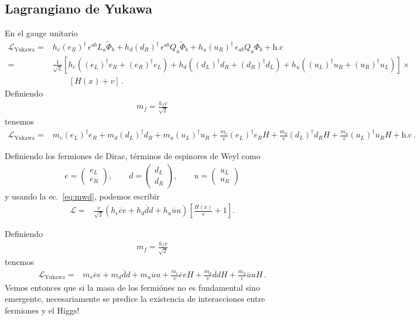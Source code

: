 \subsection{Lagrangiano  de Yukawa }

\begin{frame}
En el gauge unitario
\begin{align}
  \mathcal{L}_{\text{Yukawa}}=& h_e \left( e_R \right)^{\dagger}\,\epsilon^{ab}L_a\widetilde{\Phi}_b +
      h_d \left( d_R \right)^{\dagger}\,\epsilon^{ab}Q_a\widetilde{\Phi}_b +
      h_u \left( u_R \right)^{\dagger}\,\epsilon_{ab}Q_a{\Phi}_{b}+\text{h.c}\nonumber\\
=&\frac{1}{\sqrt{2}}\left[h_e((e_L)^{\dagger}e_R+(e_R)^{\dagger}e_L)+
h_d((d_L)^{\dagger}d_R+(d_R)^{\dagger}d_L)
+h_u((u_L)^{\dagger}u_R+(u_R)^{\dagger}u_L)\right]\times\nonumber\\
&\qquad\left[H(x)+v\right]\,.
\end{align}
Definiendo
\begin{align}
  m_f=\frac{h_fv}{\sqrt{2}}
\end{align}
tenemos
\begin{align}
\label{eq:lyuklr}
  \mathcal{L}_{\text{Yukawa}}=&m_e (e_L)^{\dagger}e_R+m_d (d_L)^{\dagger}d_R+m_u(u_L)^{\dagger}u_R
+\frac{m_e}{v}  (e_L)^{\dagger}e_RH+\frac{m_d}{v}  (d_L)^{\dagger}d_RH+\frac{m_u}{v} (u_L)^{\dagger}u_RH
+\text{h.c}\,.
\end{align}

Definiendo los fermiones de Dirac, términos de espinores de Weyl como
\begin{align}
  e=
  \begin{pmatrix}
    e_L\\
    e_R
  \end{pmatrix},\qquad d=
  \begin{pmatrix}
    d_L\\
    d_R
  \end{pmatrix},\qquad u=
  \begin{pmatrix}
    u_L\\
    u_R
  \end{pmatrix}
\end{align}
y usando la ec.~\eqref{eq:mwd}, podemos escribir
\begin{align*}
\mathcal{L}=&\frac{v}{\sqrt{2}}\left(h_e\overline{e}e+h_d\overline{d}d
+h_u\overline{u}u\right)
\left[\frac{H(x)}{v}+1\right].
\end{align*}

Definiendo
\begin{align}
  m_f=\frac{h_fv}{\sqrt{2}}
\end{align}
tenemos
\begin{align}
\label{eq:lyukfin}
 \mathcal{L}_{\text{Yukawa}}=&m_e\overline{e}e+m_d\overline{d}d
+m_u\overline{u}u+
  \frac{m_e}{v}\overline{e}e H+\frac{m_d}{v}\overline{d}d H
+\frac{m_u}{v}\overline{u}u H\,.
\end{align}
Vemos entonces que si la masa de los fermiónes no es fundamental sino
emergente, necesariamente se predice la existencia de interacciones
entre fermiones y el Higgs!

\end{frame}



